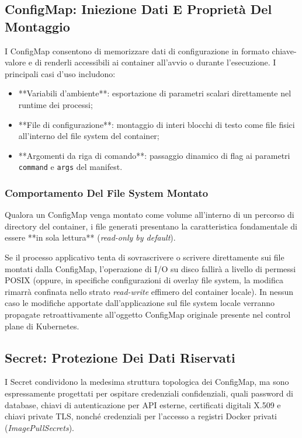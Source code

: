 \documentclass[11pt, a4paper]{article}
\begin{document}
\subsection{ConfigMap: Iniezione Dati E Proprietà Del Montaggio}

I ConfigMap consentono di memorizzare dati di configurazione in formato chiave-valore e di renderli accessibili ai container all'avvio o durante l'esecuzione. I principali casi d'uso includono:
\begin{itemize}[noitemsep]
    \item **Variabili d'ambiente**: esportazione di parametri scalari direttamente nel runtime dei processi;
    \item **File di configurazione**: montaggio di interi blocchi di testo come file fisici all'interno del file system del container;
    \item **Argomenti da riga di comando**: passaggio dinamico di flag ai parametri \texttt{command} e \texttt{args} del manifest.
\end{itemize}

\subsubsection{Comportamento Del File System Montato}
Qualora un ConfigMap venga montato come volume all'interno di un percorso di directory del container, i file generati presentano la caratteristica fondamentale di essere **in sola lettura** (\emph{read-only by default}).

Se il processo applicativo tenta di sovrascrivere o scrivere direttamente sui file montati dalla ConfigMap, l'operazione di I/O su disco fallirà a livello di permessi POSIX (oppure, in specifiche configurazioni di overlay file system, la modifica rimarrà confinata nello strato \emph{read-write} effimero del container locale). In nessun caso le modifiche apportate dall'applicazione sul file system locale verranno propagate retroattivamente all'oggetto ConfigMap originale presente nel control plane di Kubernetes.

\subsection{Secret: Protezione Dei Dati Riservati}

I Secret condividono la medesima struttura topologica dei ConfigMap, ma sono espressamente progettati per ospitare credenziali confidenziali, quali password di database, chiavi di autenticazione per API esterne, certificati digitali X.509 e chiavi private TLS, nonché credenziali per l'accesso a registri Docker privati (\emph{ImagePullSecrets}).
\end{document}
